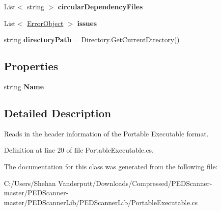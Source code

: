 \begin{DoxyCompactItemize}
List$<$ string $>$ {\bfseries circular\+Dependency\+Files}
\item 
\mbox{\label{class_p_e_d_scanner_lib_1_1_core_1_1_portable_executable_a9f26ec47968bafbbb4ebac82af1e19bd}} 
List$<$ \mbox{\hyperlink{class_p_e_d_scanner_lib_1_1_objects_1_1_error_object}{Error\+Object}} $>$ {\bfseries issues}
\item 
\mbox{\label{class_p_e_d_scanner_lib_1_1_core_1_1_portable_executable_ae7f4b4b15ab229cfe0758b01c9581642}} 
string {\bfseries directory\+Path} = Directory.\+Get\+Current\+Directory()
\end{DoxyCompactItemize}
\subsection*{Properties}
\begin{DoxyCompactItemize}
\item 
\mbox{\label{class_p_e_d_scanner_lib_1_1_core_1_1_portable_executable_a845af77651c009fae2e88eb539252ab7}} 
string {\bfseries Name}
\end{DoxyCompactItemize}


\subsection{Detailed Description}
Reads in the header information of the Portable Executable format. 

Definition at line 20 of file Portable\+Executable.\+cs.



The documentation for this class was generated from the following file\+:\begin{DoxyCompactItemize}
\item 
C\+:/\+Users/\+Shehan Vanderputt/\+Downloads/\+Compressed/\+P\+E\+D\+Scanner-\/master/\+P\+E\+D\+Scanner-\/master/\+P\+E\+D\+Scanner\+Lib/\+P\+E\+D\+Scanner\+Lib/Portable\+Executable.\+cs\end{DoxyCompactItemize}
